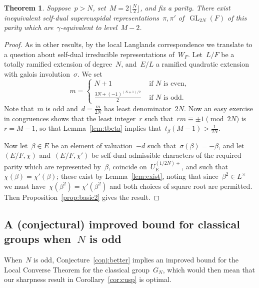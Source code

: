 \documentclass[12pt]{amsart}
\newcommand{\GL}{\operatorname{GL}}
\newtheorem{thm}{Theorem}[section]
\newtheorem{thm}[equation]{Theorem}
\def\shaun#1{\textcolor{black}{#1}}
\begin{document}
\begin{thm}\label{thm:better}
Suppose~$p>N$, set~$M=2\lfloor\frac N2\rfloor$, and fix a parity. There exist inequivalent self-dual supercuspidal representations~$\pi,\pi'$ of~$\GL_{2N}(F)$ of this parity which are~$\gamma$-equivalent to level~$M-2$.
\end{thm}

\begin{proof}
As in other results, by the local Langlands correspondence we translate to a question about self-dual irreducible representations of~$W_F$. Let~$L/F$ be a totally ramified extension of degree~$N$, and~$E/L$ a ramified quadratic extension with galois involution~$\sigma$. We set
\[
m=\begin{cases} N+1 &\text{ if~$N$ is even},\\
\frac{3N+(-1)^{(N+1)/2}}{2} &\text{ if~$N$ is odd}.
\end{cases}
\]
Note that~$m$ is odd and~$d=\frac m{2N}$ has least denominator~$2N$. Now an easy exercise in congruences shows that the least integer~$r$ such that~$rm\equiv \pm 1\pmod{2N}$ is~$r=M-1$, so that Lemma~\ref{lem:tbeta} implies that~$t_\beta(M-1)>\frac 1{2N}$.

Now let~$\beta\in E$ be an element of valuation~$-d$ such that~$\sigma(\beta)=-\beta$, and let~$(E/F,\chi)$ and~$(E/F,\chi')$ be self-dual admissible characters of the required parity which are represented by~$\beta$, coincide on~$U_E^{(1/2N)+}$, and such that~$\chi(\beta)=\chi'(\beta)$; these exist by Lemma~\ref{lem:exist}, noting that since~$\beta^2\in L^\times$ we must have~$\chi(\beta^2)=\chi'(\beta^2)$ and both choices of square root are permitted.
Then Proposition~\ref{prop:basic2} gives the result. 
\end{proof}


\subsection{A (conjectural) improved bound for classical groups when~$N$ is odd}
When~$N$ is odd, Conjecture~\ref{conj:better} implies an improved bound for the Local Converse Theorem for the classical group~$G_N$, which would then mean that our sharpness result in Corollary~\ref{cor:cusp} is optimal.
\end{document}
